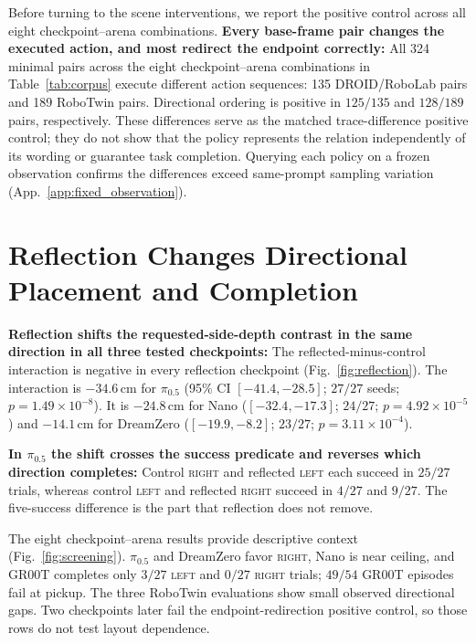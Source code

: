 \documentclass[letterpaper,10pt,conference]{ieeeconf}%
\newcommand{\tokL}{\textsc{left}}
\newcommand{\tokR}{\textsc{right}}
\newcommand{\tightparagraph}[1]{\vspace{0.25em}\noindent\textbf{#1}}
\begin{document}
Before turning to the scene interventions, we report the positive control across all eight checkpoint--arena combinations.
\tightparagraph{Every base-frame pair changes the executed action, and most redirect the endpoint correctly:}
All 324 minimal pairs across the eight checkpoint--arena combinations in Table~\ref{tab:corpus} execute different action sequences: 135 DROID/RoboLab pairs and 189 RoboTwin pairs.
Directional ordering is positive in $125/135$ and $128/189$ pairs, respectively.
These differences serve as the matched trace-difference positive control; they do not show that the policy represents the relation independently of its wording or guarantee task completion.
Querying each policy on a frozen observation confirms the differences exceed same-prompt sampling variation (App.~\ref{app:fixed_observation}).

\section{Reflection Changes Directional Placement and Completion}
\label{sec:reflection}

\tightparagraph{Reflection shifts the requested-side-depth contrast in the same direction in all three tested checkpoints:}
The reflected-minus-control interaction is negative in every reflection checkpoint (Fig.~\ref{fig:reflection}).
The interaction is $-34.6$\,cm for $\pi_{0.5}$ (95\% CI $[-41.4,-28.5]$; $27/27$ seeds; $p=1.49\times10^{-8}$).
It is $-24.8$\,cm for Nano ($[-32.4,-17.3]$; $24/27$; $p=4.92\times10^{-5}$) and $-14.1$\,cm for DreamZero ($[-19.9,-8.2]$; $23/27$; $p=3.11\times10^{-4}$).

\tightparagraph{In $\pi_{0.5}$ the shift crosses the success predicate and reverses which direction completes:}
Control \tokR{} and reflected \tokL{} each succeed in $25/27$ trials, whereas control \tokL{} and reflected \tokR{} succeed in $4/27$ and $9/27$.
The five-success difference is the part that reflection does not remove.

The eight checkpoint--arena results provide descriptive context (Fig.~\ref{fig:screening}).
$\pi_{0.5}$ and DreamZero favor \tokR{}, Nano is near ceiling, and GR00T completes only $3/27$ \tokL{} and $0/27$ \tokR{} trials; $49/54$ GR00T episodes fail at pickup.
The three RoboTwin evaluations show small observed directional gaps.
Two checkpoints later fail the endpoint-redirection positive control, so those rows do not test layout dependence.
\end{document}

